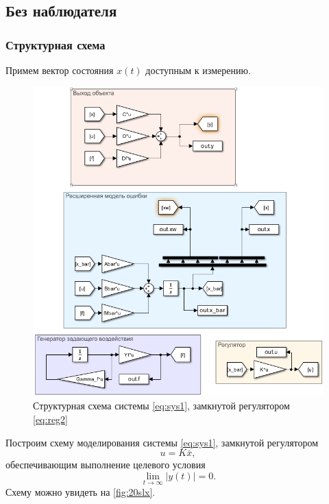 \subsection{Без наблюдателя}

\subsubsection{Структурная схема}

Примем вектор состояния $x(t)$ доступным к измерению.
\begin{figure}[H]
    \centering
    \includegraphics[width=\linewidth]{figs/2_0_slx.png}
    \caption{Структурная схема системы \eqref{eq:sys1}, замкнутой регулятором
    \eqref{eq:reg2}}
    \label{fig:20slx}
\end{figure}
Построим схему 
моделирования системы \eqref{eq:sys1}, замкнутой регулятором
\begin{equation}
    \label{eq:reg2}
    u=K\bar x,
\end{equation}
обеспечивающим выполнение целевого условия
\begin{equation}
    \label{eq:aim2}
    \lim_{t\rightarrow\infty}|y(t)|=0.
\end{equation}
Схему можно увидеть на \autoref{fig:20slx}. 

